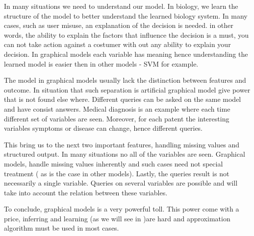 In many situations we need to understand our model.
In biology, we learn the structure of the model to better understand the learned biology system.
In many cases, such as user misuse, an explanation of the decision is needed. 
in other words, the ability to explain the factors that influence the decision is a must, you can not take action against a costumer with out any ability to explain your decision. 
In graphical models each variable has meaning hence understanding the learned model is easier then in other models - SVM for example.

The model in graphical models usually lack the distinction between features and outcome.
In situation that such separation is artificial graphical model give power that is not found else where.
Different queries can be asked on the same model and have consist answers.
Medical diagnosis is an example where each time different set of variables are seen.
Moreover, for each patent the interesting variables  symptoms or disease can change, hence different queries.

This bring us to the next two important features, handling missing values and structured output.
In many situations no all of the variables are seen.
Graphical models, handle missing values inherently and such cases need not special treatment ( as is the case in other models).
Lastly, the queries result is not necessarily a single variable.
Queries on several variables are possible and will take into account the relation between these variables.

To conclude, graphical models is a very powerful toll.
This power come with a price,  inferring and learning (as we will see in )are hard and approximation algorithm must be used in most cases.

